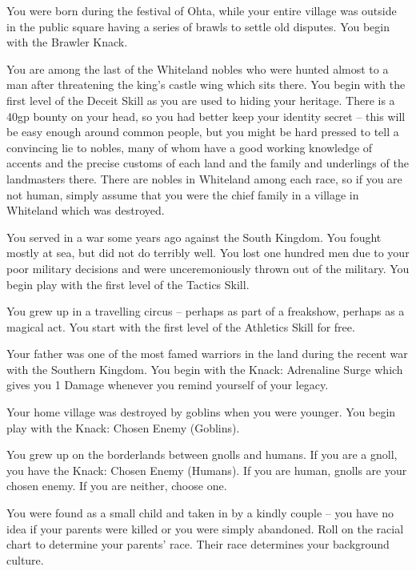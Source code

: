 \begin{multicols}{2}
\begin{list}{\addtocounter{list}{1}\textbf{:}}{\raggedleft}
\item{You were born during the festival of Ohta, while your entire village was outside in the public square having a series of brawls to settle old disputes.  You begin with the Brawler Knack.}

\item{You are among the last of the Whiteland nobles who were hunted almost to a man after threatening the king's castle wing which sits there.  You begin with the first level of the Deceit Skill as you are used to hiding your heritage.  There is a 40gp bounty on your head, so you had better keep your identity secret -- this will be easy enough around common people, but you might be hard pressed to tell a convincing lie to nobles, many of whom have a good working knowledge of accents and the precise customs of each land and the family and underlings of the landmasters there.  There are nobles in Whiteland among each race, so if you are not human, simply assume that you were the chief family in a village in Whiteland which was destroyed.}

\item{You served in a war some years ago against the South Kingdom.  You fought mostly at sea, but did not do terribly well.  You lost one hundred men due to your poor military decisions and were unceremoniously thrown out of the military.  You begin play with the first level of the Tactics Skill.}

\item{You grew up in a travelling circus -- perhaps as part of a freakshow, perhaps as a magical act.  You start with the first level of the Athletics Skill for free.}

\item{Your father was one of the most famed warriors in the land during the recent war with the Southern Kingdom.  You begin with the Knack: Adrenaline Surge which gives you 1 Damage whenever you remind yourself of your legacy.}

\item{Your home village was destroyed by goblins when you were younger.
You begin play with the Knack: Chosen Enemy (Goblins).}

\item{You grew up on the borderlands between gnolls and humans.  If you are a gnoll, you have the Knack: Chosen Enemy (Humans).  If you are human, gnolls are your chosen enemy.  If you are neither, choose one.}

\item{You were found as a small child and taken in by a kindly couple -- you have no idea if your parents were killed or you were simply abandoned. Roll on the racial chart to determine your parents' race.  Their race determines your background culture.}


\end{list}
\end{multicols}
